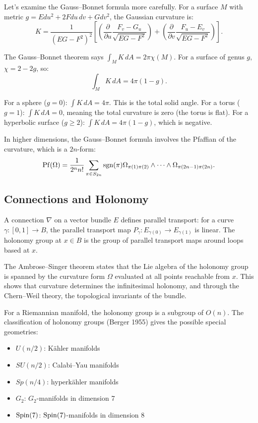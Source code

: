 Let's examine the Gauss--Bonnet formula more carefully. For a surface $M$ with metric $g = E du^2 + 2F du\,dv + G dv^2$, the Gaussian curvature is:
\[
K = \frac{1}{(EG - F^2)^2} \left[ \left(\frac{\partial}{\partial u} \frac{F_v - G_u}{\sqrt{EG - F^2}}\right) + \left(\frac{\partial}{\partial v} \frac{F_u - E_v}{\sqrt{EG - F^2}}\right) \right].
\]

The Gauss--Bonnet theorem says $\int_M K \, dA = 2\pi \chi(M)$. For a surface of genus $g$, $\chi = 2 - 2g$, so:
\[
\int_M K \, dA = 4\pi(1 - g).
\]

For a sphere ($g=0$): $\int K \, dA = 4\pi$. This is the total solid angle. For a torus ($g=1$): $\int K \, dA = 0$, meaning the total curvature is zero (the torus is flat). For a hyperbolic surface ($g \geq 2$): $\int K \, dA = 4\pi(1-g)$, which is negative.

In higher dimensions, the Gauss--Bonnet formula involves the Pfaffian of the curvature, which is a $2n$-form:
\[
\operatorname{Pf}(\Omega) = \frac{1}{2^n n!} \sum_{\pi \in S_{2n}} \operatorname{sgn}(\pi) \Omega_{\pi(1)\pi(2)} \wedge \cdots \wedge \Omega_{\pi(2n-1)\pi(2n)}.
\]

\subsection*{Connections and Holonomy}

A connection $\nabla$ on a vector bundle $E$ defines parallel transport: for a curve $\gamma: [0,1] \to B$, the parallel transport map $P_\gamma: E_{\gamma(0)} \to E_{\gamma(1)}$ is linear. The holonomy group at $x \in B$ is the group of parallel transport maps around loops based at $x$.

The Ambrose--Singer theorem states that the Lie algebra of the holonomy group is spanned by the curvature form $\Omega$ evaluated at all points reachable from $x$. This shows that curvature determines the infinitesimal holonomy, and through the Chern--Weil theory, the topological invariants of the bundle.

For a Riemannian manifold, the holonomy group is a subgroup of $O(n)$. The classification of holonomy groups (Berger 1955) gives the possible special geometries:
\begin{itemize}
    \item $U(n/2)$: K\"{a}hler manifolds
    \item $SU(n/2)$: Calabi--Yau manifolds
    \item $Sp(n/4)$: hyperk\"{a}hler manifolds
    \item $G_2$: $G_2$-manifolds in dimension 7
    \item $\operatorname{Spin}(7)$: $\operatorname{Spin}(7)$-manifolds in dimension 8
\end{itemize}

